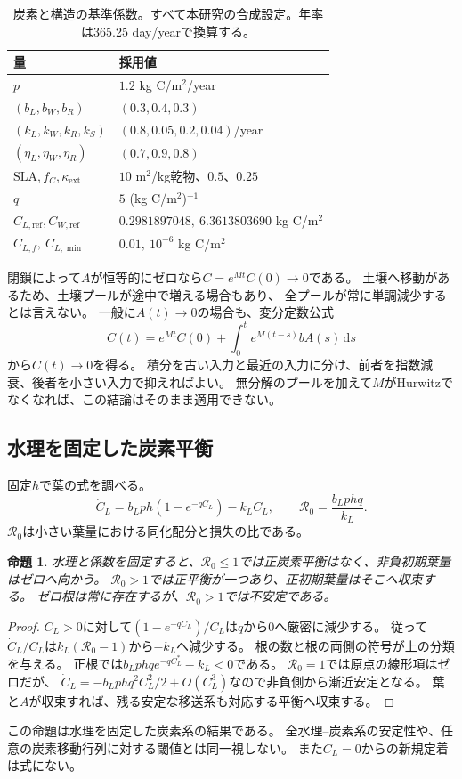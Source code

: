 \documentclass[a4paper,11pt]{ltjsarticle}
\newcommand{\dd}{\mathrm{d}}
\newtheorem{proposition}{命題}[section]
\begin{document}
\begin{table}[tb]
\centering
\caption{炭素と構造の基準係数。すべて本研究の合成設定。年率は365.25 day/yearで換算する。}
\begin{tabular}{ll}
\toprule
量 & 採用値\\\midrule
$p$ & $1.2$ kg C/m$^2$/year\\
$(b_L,b_W,b_R)$ & $(0.3,0.4,0.3)$\\
$(k_L,k_W,k_R,k_S)$ & $(0.8,0.05,0.2,0.04)$/year\\
$(\eta_L,\eta_W,\eta_R)$ & $(0.7,0.9,0.8)$\\
$\mathrm{SLA},f_C,\kappa_{\mathrm{ext}}$ & $10$ m$^2$/kg乾物、$0.5$、$0.25$\\
$q$ & $5$ (kg C/m$^2$)$^{-1}$\\
$C_{L,\mathrm{ref}},C_{W,\mathrm{ref}}$ & $0.2981897048,\ 6.3613803690$ kg C/m$^2$\\
$C_{L,f},\ C_{L,\min}$ & $0.01,\ 10^{-6}$ kg C/m$^2$\\
\bottomrule
\end{tabular}
\end{table}

閉鎖によって$A$が恒等的にゼロなら$C=e^{Mt}C(0)\to0$である。
土壌へ移動があるため、土壌プールが途中で増える場合もあり、
全プールが常に単調減少するとは言えない。
一般に$A(t)\to0$の場合も、変分定数公式
\begin{equation}\label{eq:variation}
 C(t)=e^{Mt}C(0)+\int_0^t e^{M(t-s)}bA(s)\,\dd s
\end{equation}
から$C(t)\to0$を得る。
積分を古い入力と最近の入力に分け、前者を指数減衰、後者を小さい入力で抑えればよい。
無分解のプールを加えて$M$がHurwitzでなくなれば、この結論はそのまま適用できない。

\subsection{水理を固定した炭素平衡}\label{sec:r0}
固定$h$で葉の式を調べる。
\begin{equation}
 \dot C_L=b_Lph(1-e^{-qC_L})-k_LC_L,\qquad
 \mathcal R_0=\frac{b_Lphq}{k_L}.
\end{equation}
$\mathcal R_0$は小さい葉量における同化配分と損失の比である。
\begin{proposition}\label{prop:r0}
水理と係数を固定すると、$\mathcal R_0\le1$では正炭素平衡はなく、非負初期葉量はゼロへ向かう。
$\mathcal R_0>1$では正平衡が一つあり、正初期葉量はそこへ収束する。
ゼロ根は常に存在するが、$\mathcal R_0>1$では不安定である。
\end{proposition}
\begin{proof}
$C_L>0$に対して$(1-e^{-qC_L})/C_L$は$q$から0へ厳密に減少する。
従って$\dot C_L/C_L$は$k_L(\mathcal R_0-1)$から$-k_L$へ減少する。
根の数と根の両側の符号が上の分類を与える。
正根では$b_Lphqe^{-qC_L^*}-k_L<0$である。
$\mathcal R_0=1$では原点の線形項はゼロだが、
$\dot C_L=-b_Lphq^2C_L^2/2+O(C_L^3)$なので非負側から漸近安定となる。
葉と$A$が収束すれば、残る安定な移送系も対応する平衡へ収束する。
\end{proof}
この命題は水理を固定した炭素系の結果である。
全水理--炭素系の安定性や、任意の炭素移動行列に対する閾値とは同一視しない。
また$C_L=0$からの新規定着は式にない。
\end{document}
